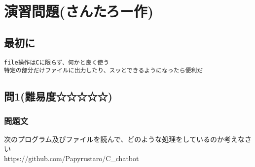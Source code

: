 \section{演習問題(さんたろー作)}
\subsection{最初に}
\begin{verbatim}
file操作はCに限らず、何かと良く使う
特定の部分だけファイルに出力したり、スッとできるようになったら便利だ

\end{verbatim}
\subsection{問1(難易度☆☆☆☆☆)}
\subsubsection{問題文}
次のプログラム及びファイルを読んで、どのような処理をしているのか考えなさい\\

https://github.com/Papyrustaro/C\_chatbot
